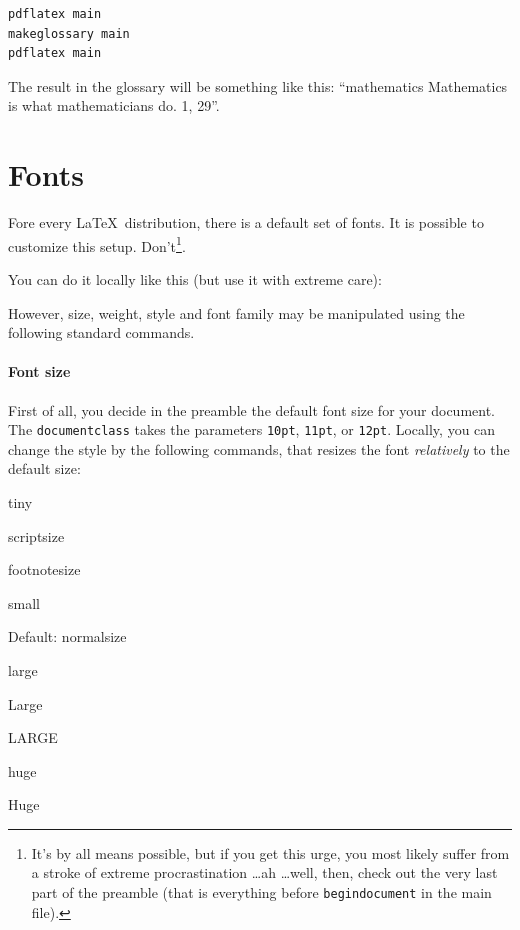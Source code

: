 \begin{lstlisting}[float,float=!h]
pdflatex main
makeglossary main
pdflatex main
\end{lstlisting}

The result in the glossary will be something like this:  ``mathematics Mathematics is what mathematicians do. 1, 29''.

\section{Fonts}

Fore every  \LaTeX\ distribution, there is a default set of fonts.
It is possible to customize this  setup.
Don't\footnote{It's by all means possible, but if you get this urge, you most likely suffer from a stroke of extreme procrastination \dots ah \dots well, then, check out the very last part of the preamble (that is everything before {\tt begin{document}} in the main file).}.

You can do it locally like this (but use it with extreme care):

{\selectfont \lipsum[21]}

However, size, weight, style and font family may be manipulated using the following standard commands.

\paragraph{Font size}

First of all, you decide in the preamble the default font size for your document. The {\tt documentclass} takes the parameters {\tt 10pt},  {\tt 11pt},  or {\tt 12pt}. Locally, you can change the style by the following commands, that resizes the font {\em relatively} to the default size:

    \tiny tiny
    
    \scriptsize scriptsize
    
    \footnotesize footnotesize
    
    \small small
    
    \normalsize Default: normalsize
    
    \large  large
    
    \Large Large
    
    \LARGE LARGE
    
    \huge huge
    
    \Huge  Huge
    
    \normalsize 
    
